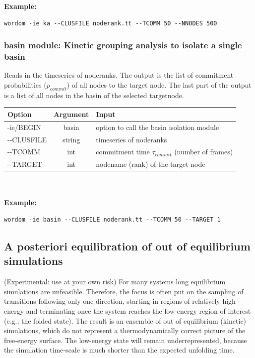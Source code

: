 \documentclass[11pt,twoside,onecolumn,a4paper,openright,notitlepage]{book}[2001/04/21]
\begin{document}
{\bf Example:}

\begin{verbatim}wordom -ie ka --CLUSFILE noderank.tt --TCOMM 50 --NNODES 500 \end{verbatim}

\subsubsection{basin module: Kinetic grouping analysis to isolate a single basin}

Reads in the timeseries of noderanks. The output is the list of commitment probabilities ($p_{commit}$) of all nodes to the target node. The last part of the output is a list of all nodes in the basin of the selected targetnode.\\

\begin{tabular}{l|c|l}
Option & Argument & Input \\
\hline
-ie/BEGIN    & basin & option to call the basin isolation module\\
-{}-CLUSFILE & string & timeseries of noderanks \\
-{}-TCOMM    & int    & commitment time $\tau_{commit}$ (number of frames) \\
-{}-TARGET   & int    & nodename (rank) of the target node\\
\end{tabular}\\
\\

{\bf Example:}
 
\begin{verbatim}wordom -ie basin --CLUSFILE noderank.tt --TCOMM 50 --TARGET 1 \end{verbatim}



\subsection{A posteriori equilibration of out of equilibrium simulations}

(Experimental: use at your own risk) For many systems long equilibrium simulations are unfeasible. Therefore, the focus is often put on the sampling of transitions following only one direction, starting in regions of relatively high energy and terminating once the system reaches the low-energy region of interest (e.g., the folded state). The result is an ensemble of out of equilibrium (kinetic) simulations, which do not represent a thermodynamically correct picture of the free-energy surface. The low-energy state will remain underrepresented, because the simulation time-scale is much shorter than the expected unfolding time.
\end{document}
